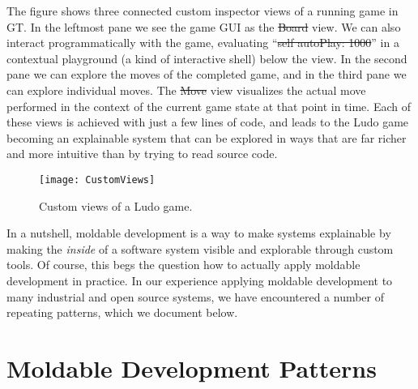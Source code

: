 \documentclass[sigconf,screen]{acmart}
\newcommand\rb[1]{\nbc{Ralf}{#1}{teal}}
\newcommand\cp[1]{\nbe{Cesare}{#1}{olive}} %
\begin{document}
The figure shows three connected custom inspector views
of a running game in GT.
In the leftmost pane we see the game GUI as the \st{Board} view.
We can also interact programmatically with the game, evaluating ``\st{self autoPlay: 1000}'' in a contextual playground (a kind of interactive shell) below the view.
In the second pane we can explore the moves of  the completed game, and in the third pane we can explore individual moves.
The \st{Move} view visualizes the actual move performed in the context of the current game state at that point in time.
Each of these views is achieved with just a few lines of code, and leads to the Ludo game becoming an explainable system that can be explored in ways that are far richer and more intuitive than by trying to read source code.

\begin{figure}[h]
  \texttt{[image: CustomViews]}
  \caption{Custom views of a Ludo game.}
  \label{fig:ludoViews}
\end{figure}


In a nutshell, moldable development is a way to make systems explainable by making the \emph{inside} of a software system visible and explorable through custom tools.
Of course, this begs the question how to actually apply moldable development in practice.
In our experience applying moldable development to many industrial and open source systems, we have encountered a number of repeating patterns, which we document below.

\section{Moldable Development Patterns}

\end{document}
